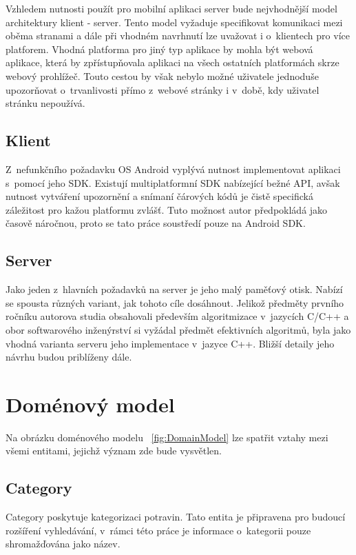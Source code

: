 \documentclass[thesis=B,czech]{FITthesis}[2013/10/20]
\begin{document}
Vzhledem nutnosti použít pro mobilní aplikaci server bude nejvhodnější model architektury klient - server. Tento model vyžaduje specifikovat komunikaci mezi oběma stranami a dále při vhodném navrhnutí lze uvažovat i o~klientech pro více platforem. Vhodná platforma pro jiný typ aplikace by mohla být webová aplikace, která by zpřístupňovala aplikaci na všech ostatních platformách skrze webový prohlížeč. Touto cestou by však nebylo možné uživatele jednoduše upozorňovat o~trvanlivosti přímo z~webové stránky i v~době, kdy uživatel stránku nepoužívá.

\subsection{Klient}

Z~nefunkčního požadavku OS Android vyplývá nutnost implementovat aplikaci s~pomocí jeho SDK. Existují multiplatformní SDK nabízející bežné API, avšak nutnost vytváření upozornění a snímaní čárových kódů je čistě specifická záležitost pro kažou platformu zvlášť. Tuto možnost autor předpokládá jako časově náročnou, proto se tato práce soustředí pouze na Android SDK.

\subsection{Server}

Jako jeden z~hlavních požadavků na server je jeho malý paměťový otisk. Nabízí se spousta různých variant, jak tohoto cíle dosáhnout. Jelikož předměty prvního ročníku autorova studia obsahovali především algoritmizace v~jazycích C/C++ a obor softwarového inženýrství si vyžádal předmět efektivních algoritmů, byla jako vhodná varianta serveru jeho implementace v~jazyce C++. Bližší detaily jeho návrhu budou priblíženy dále.

\section{Doménový model}

Na obrázku doménového modelu ~\ref{fig:DomainModel} lze spatřit vztahy mezi všemi entitami, jejichž význam zde bude vysvětlen.

\subsection{Category}
Category poskytuje kategorizaci potravin. Tato entita je připravena pro budoucí rozšíření vyhledávání, v~rámci této práce je informace o~kategorii pouze shromažďována jako název.
\end{document}
